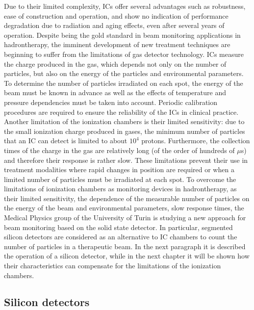 \noindent Due to their limited complexity, ICs offer several advantages such as robustness, ease of construction and operation, and show no indication of performance degradation due to radiation and aging effects, even after several years of operation.
Despite being the gold standard in beam monitoring applications in hadrontherapy, the imminent development of new treatment techniques are beginning to suffer from the limitations of gas detector technology.
\newline
ICs measure the charge produced in the gas, which depends not only on the number of particles, but also on the energy of the particles and environmental parameters.
To determine the number of particles irradiated on each spot, the energy of the beam must be known in advance as well as the effects of temperature and pressure dependencies must be taken into account.
Periodic calibration procedures are required to ensure the reliability of the ICs in clinical practice.
Another limitation of the ionization chambers is their limited sensitivity: due to the small ionization charge produced in gases, the minimum number of particles that an IC can detect is limited to about $10^4$ protons.
Furthermore, the collection times of the charge in the gas are relatively long (of the order of hundreds of $\mu$s) and therefore their response is rather slow.
These limitations prevent their use in treatment modalities where rapid changes in position are required or when a limited number of particles must be irradiated at each spot.
\newline
To overcome the limitations of ionization chambers as monitoring devices in hadrontherapy, as their limited sensitivity, the dependence of the measurable number of particles on the energy of the beam and environmental parameters, slow response times, the Medical Physics group of the University of Turin is studying a new approach for beam monitoring based on the solid state detector.
In particular, segmented silicon detectors are considered as an alternative to IC chambers to count the number of particles in a therapeutic beam.
\newline
In the next paragraph it is described the operation of a silicon detector, while in the next chapter it will be shown how their characteristics can compensate for the limitations of the ionization chambers.



\subsection{Silicon detectors}

